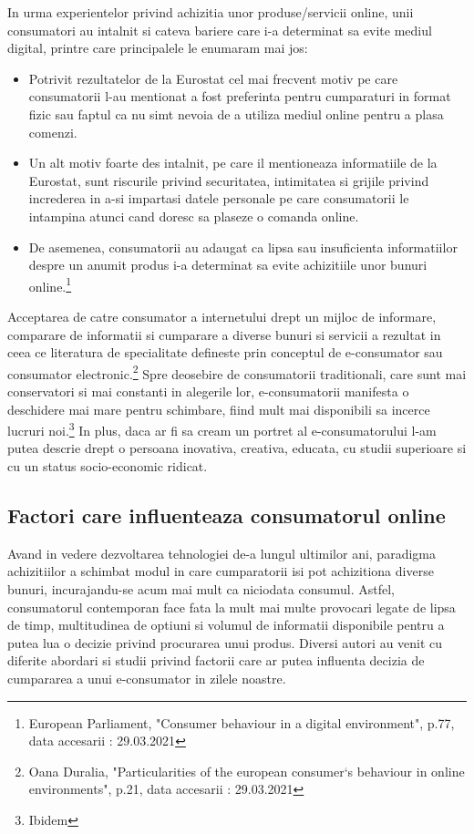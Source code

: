 \documentclass[a4paper, 12pt]{article}
\begin{document}
\quad In urma experientelor privind achizitia unor produse/servicii online, unii consumatori au intalnit si cateva bariere care i-a determinat sa evite mediul digital, printre care principalele le enumaram mai jos:
\begin{itemize}
	\item Potrivit rezultatelor de la Eurostat cel mai frecvent motiv pe care consumatorii l-au mentionat a fost preferinta pentru cumparaturi in format fizic sau faptul ca nu simt nevoia de a utiliza mediul online pentru a plasa comenzi.
	\item Un alt motiv foarte des intalnit, pe care il mentioneaza informatiile de la Eurostat, sunt riscurile privind securitatea, intimitatea si grijile privind increderea in a-si impartasi datele personale pe care consumatorii le intampina atunci cand doresc sa plaseze o comanda online.
	\item De asemenea, consumatorii au adaugat ca lipsa sau insuficienta informatiilor despre un anumit produs i-a determinat sa evite achizitiile unor bunuri online.\footnote{European Parliament, "Consumer behaviour in a digital environment", p.77, data accesarii : 29.03.2021}
\end{itemize}

	\quad Acceptarea de catre consumator a internetului drept un mijloc de informare, comparare de informatii  si cumparare a diverse bunuri si servicii a rezultat in ceea ce literatura de specialitate defineste prin conceptul de e-consumator sau consumator electronic.\footnote{Oana Duralia, "Particularities of the european consumer`s behaviour in online environments", p.21, data accesarii : 29.03.2021}  Spre deosebire de consumatorii traditionali, care sunt mai conservatori si mai constanti in alegerile lor, e-consumatorii manifesta o deschidere mai mare pentru schimbare, fiind mult mai disponibili sa incerce lucruri noi.\footnote{Ibidem} In plus, daca ar fi sa cream un portret al e-consumatorului l-am putea descrie drept o persoana inovativa, creativa, educata, cu studii superioare si cu un status socio-economic ridicat.
	

	\subsection{Factori care influenteaza consumatorul online}
	\qquad\space Avand in vedere dezvoltarea tehnologiei de-a lungul ultimilor ani,  paradigma achizitiilor a schimbat modul in care cumparatorii isi pot achizitiona diverse bunuri, incurajandu-se acum mai mult ca niciodata consumul. Astfel, consumatorul contemporan face fata la mult mai multe provocari legate de lipsa de timp, multitudinea de optiuni si volumul de informatii disponibile pentru a putea lua o decizie privind procurarea unui produs. Diversi autori au venit cu diferite abordari si studii privind factorii care ar putea influenta decizia de cumpararea a unui e-consumator in zilele noastre.
	
\end{document}
